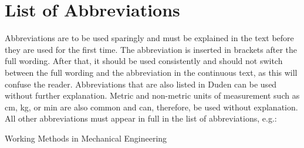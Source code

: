 \pagestyle{plain}
\chapter*{List of Abbreviations}

\noindent Abbreviations are to be used sparingly and must be explained in the text before they are used for the first time. 
The abbreviation is inserted in brackets after the full wording. 
After that, it should be used consistently and should not switch between the full wording and the abbreviation in the continuous text, as this will confuse the reader. 
Abbreviations that are also listed in Duden can be used without further explanation. 
Metric and non-metric units of measurement such as cm, kg, or min are also common and can, therefore, be used without explanation. 
All other abbreviations must appear in full in the list of abbreviations, e.g.:

\begin{acronym}[WME]
	 {Working Methods in Mechanical Engineering}
\end{acronym}